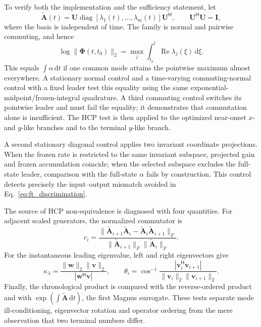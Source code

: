 To verify both the implementation and the sufficiency statement, let
\begin{equation}
 \widetilde{\boldsymbol A}(t)=\boldsymbol U
 \operatorname{diag}[\lambda_1(t),\ldots,\lambda_m(t)]\boldsymbol U^{\mathsf H},
 \qquad \boldsymbol U^{\mathsf H}\boldsymbol U=\boldsymbol I,
 \label{eq:ft_commuting_normal_control}
\end{equation}
where the basis is independent of time. The family is normal and pairwise commuting, and hence
\begin{equation}
 \log\|\boldsymbol\Phi(t,t_0)\|_2
 =\max_j\int_{t_0}^{t}\operatorname{Re}\lambda_j(\xi)\,\mathrm d\xi.
 \label{eq:ft_commuting_normal_identity}
\end{equation}
This equals $\int\alpha\,\mathrm dt$ if one common mode attains the pointwise maximum almost everywhere. A stationary normal control and a time-varying commuting-normal control with a fixed leader test this equality using the same exponential-midpoint/frozen-integral quadrature. A third commuting control switches its pointwise leader and must fail the equality; it demonstrates that commutation alone is insufficient. The HCP test is then applied to the optimized near-onset $x$- and $y$-like branches and to the terminal $y$-like branch.

A second stationary diagonal control applies two invariant coordinate
projections. When the frozen rate is restricted to the same invariant
subspace, projected gain and frozen accumulation coincide; when the selected
subspace excludes the full-state leader, comparison with the full-state
$\alpha$ fails by construction. This control detects precisely the
input--output mismatch avoided in Eq.~\eqref{eq:ft_discrimination}.

The source of HCP non-equivalence is diagnosed with four quantities. For
adjacent scaled generators, the normalized commutator is
\begin{equation}
 c_i=\frac{\|\widetilde{\boldsymbol A}_{i+1}
 \widetilde{\boldsymbol A}_i-
 \widetilde{\boldsymbol A}_i
 \widetilde{\boldsymbol A}_{i+1}\|_F}
 {\|\widetilde{\boldsymbol A}_{i+1}\|_F
  \|\widetilde{\boldsymbol A}_i\|_F}.
 \label{eq:ft_commutator_diagnostic}
\end{equation}
For the instantaneous leading eigenvalue, left and right eigenvectors give
\begin{equation}
 \kappa_\lambda
 =\frac{\|\boldsymbol w\|_2\|\boldsymbol v\|_2}
 {|\boldsymbol w^{\mathsf H}\boldsymbol v|},
 \qquad
 \theta_i=\cos^{-1}\!
 \frac{|\boldsymbol v_i^{\mathsf H}\boldsymbol v_{i+1}|}
 {\|\boldsymbol v_i\|_2\|\boldsymbol v_{i+1}\|_2}.
 \label{eq:ft_modal_condition_rotation}
\end{equation}
Finally, the chronological product is compared with the reverse-ordered
product and with $\exp(\int\widetilde{\boldsymbol A}\,\mathrm dt)$, the first
Magnus surrogate. These tests separate mode ill-conditioning, eigenvector
rotation and operator ordering from the mere observation that two terminal
numbers differ.


